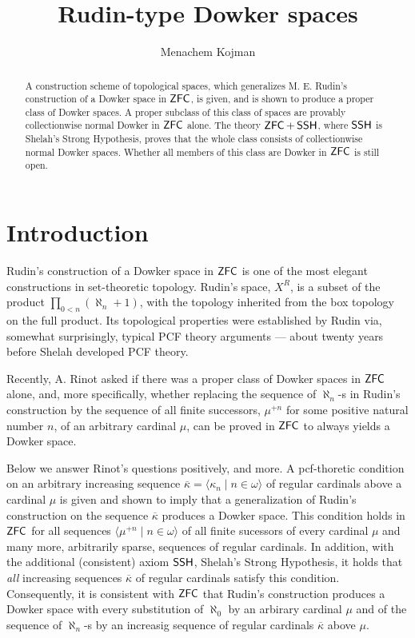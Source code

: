 \documentclass{amsart}
\title{Rudin-type Dowker spaces}
\author[M. Kojman]{Menachem Kojman}
\theoremstyle{remark}
\DeclareMathOperator{\zfc}{\sf ZFC}
\DeclareMathOperator{\ssh}{\sf SSH}
\renewcommand\mid{\mathrel{|}\allowbreak}
\begin{document}
\begin{abstract}
A construction scheme of topological spaces, which generalizes M. E. Rudin's
construction of a Dowker space in \(\zfc\), is given, and is shown to produce
a proper class of Dowker spaces. A proper subclass of this class of  spaces
are provably collectionwise normal Dowker in \(\zfc\) alone. The theory
\(\zfc +\ssh\), where \(\ssh\) is Shelah's Strong Hypothesis, proves that  the whole class
consists of collectionwise normal  Dowker spaces. Whether all members of this class are Dowker in \(\zfc\) is still open.
\end{abstract}

\maketitle
\section{Introduction}
Rudin's construction of a Dowker space in \(\zfc\) \cite{rudin} is one of the
most elegant constructions in set-theoretic topology. Rudin's  space, \(X^R\), 
is a subset of the product \(\prod_{0<n} (\aleph_n+1)\), with the topology
inherited from the box topology on the full product. Its topological properties
were established by Rudin via, somewhat surprisingly,  typical PCF theory arguments --- about twenty years before Shelah developed  PCF theory. 

Recently, A. Rinot asked if there was a proper class of Dowker spaces in \(\zfc\) alone, and, more specifically, whether replacing the sequence of \(\aleph_n\)-s in Rudin's construction by the sequence of all finite successors, \(\mu^{+n}\) for some positive natural number \(n\), of an arbitrary
cardinal \(\mu\), can be proved in \(\zfc\) to always yields a Dowker space. 

Below we answer Rinot's questions positively, and more. A pcf-thoretic condition on an
arbitrary increasing sequence \(\overline \kappa=\langle \kappa_n\mid n\in \omega\rangle\) 
of regular cardinals
above a cardinal \(\mu\)
is given and shown to imply that a generalization of Rudin's construction 
on the sequence \(\overline \kappa\) produces a Dowker space. This condition 
holds in \(\zfc\) for 
all sequences \(\langle \mu^{+n}\mid n\in \omega\rangle\) of all finite 
sucessors of every cardinal \(\mu\) and many more, arbitrarily sparse, sequences
of regular cardinals. In addition, with the additional (consistent) 
axiom
\(\ssh\), Shelah's Strong Hypothesis, it holds that \emph{all} increasing 
sequences \(\overline \kappa\) of regular cardinals satisfy this condition. 
Consequently,
it is consistent with \(\zfc\) that Rudin's construction produces a Dowker space with every substitution of \(\aleph_0\) by an arbirary cardinal \(\mu\) and of the sequence of \(\aleph_n\)-s by an increasig sequence of regular cardinals \(\overline \kappa\) above 
\(\mu\). 
\end{document}
